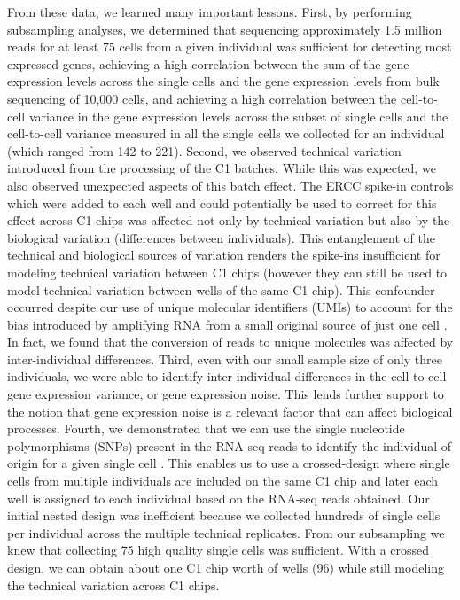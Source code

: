 From these data, we learned many important lessons. First, by
performing subsampling analyses, we determined that sequencing
approximately 1.5 million reads for at least 75 cells from a given
individual was sufficient for detecting most expressed genes,
achieving a high correlation between the sum of the gene expression
levels across the single cells and the gene expression levels from
bulk sequencing of 10,000 cells, and achieving a high correlation
between the cell-to-cell variance in the gene expression levels across
the subset of single cells and the cell-to-cell variance measured in
all the single cells we collected for an individual (which ranged from
142 to 221). Second, we observed technical variation introduced from
the processing of the C1 batches. While this was expected, we also
observed unexpected aspects of this batch effect. The ERCC spike-in
controls which were added to each well and could potentially be used
to correct for this effect across C1 chips was affected not only by
technical variation but also by the biological variation (differences
between individuals). This entanglement of the technical and
biological sources of variation renders the spike-ins insufficient for
modeling technical variation between C1 chips (however they can still
be used to model technical variation between wells of the same C1
chip). This confounder occurred despite our use of unique molecular
identifiers (UMIs) to account for the bias introduced by amplifying
RNA from a small original source of just one cell \citep{Kivioja2011, Islam2014}. In fact, we found
that the conversion of reads to unique molecules was affected by
inter-individual differences. Third, even with our small sample size
of only three individuals, we were able to identify inter-individual
differences in the cell-to-cell gene expression variance, or gene
expression noise. This lends further support to the notion that gene
expression noise is a relevant factor that can affect biological
processes. Fourth, we demonstrated that we can use the single
nucleotide polymorphisms (SNPs) present in the RNA-seq reads to
identify the individual of origin for a given single cell \citep{Jun2012}. This
enables us to use a crossed-design where single cells from multiple
individuals are included on the same C1 chip and later each well is
assigned to each individual based on the RNA-seq reads obtained. Our
initial nested design was inefficient because we collected hundreds of
single cells per individual across the multiple technical
replicates. From our subsampling we knew that collecting 75 high
quality single cells was sufficient. With a crossed design, we can
obtain about one C1 chip worth of wells (96) while still modeling the
technical variation across C1 chips.

